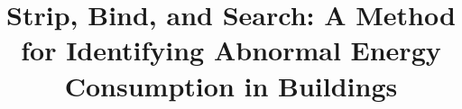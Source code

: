 \documentclass{sig-alternate-ipsn13}
\title{Strip, Bind, and Search: A Method for Identifying Abnormal Energy Consumption in Buildings}
\begin{document}
\maketitle



















\small


\end{document}
